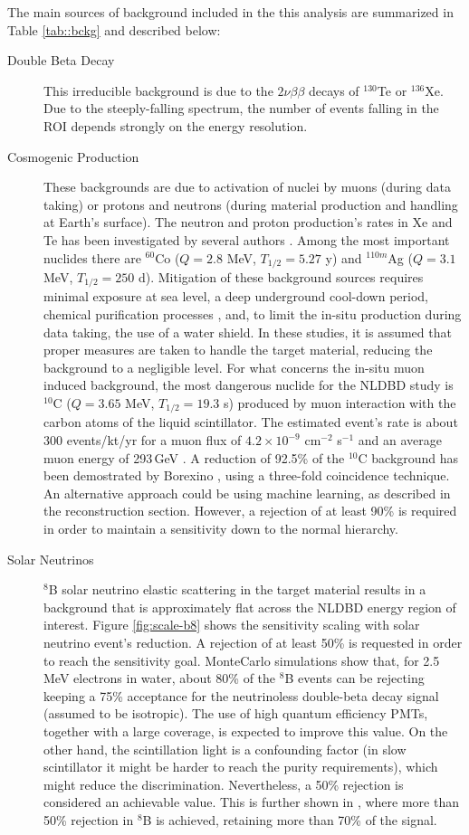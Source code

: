The main sources of background included in the this analysis are summarized in Table \ref{tab::bckg} and described below:

\begin{description}
\item[Double Beta Decay] This irreducible background is due to the $2\nu\beta\beta$ decays of $^{130}$Te or $^{136}$Xe. Due to the steeply-falling
spectrum, the number of events falling in the ROI depends strongly on the energy resolution.
\item[Cosmogenic Production] These backgrounds are due to activation of nuclei by muons (during data taking) or protons and neutrons (during material production and handling at Earth's surface). The neutron and proton production's rates in Xe and Te has been investigated by several authors \cite{mei09, baudis15, zhang16, norm05, bard97, wang15, lozza15}. Among the most important nuclides there are $^{60}$Co ($Q=2.8$ MeV, $T_{1/2}=5.27$ y) and $^{110m}$Ag ($Q=3.1$ MeV, $T_{1/2}=250$ d). Mitigation of these background sources requires minimal exposure at sea level, a deep underground cool-down period, chemical purification processes \cite{snop16}, and, to limit the in-situ production during data taking, the use of a water shield. In these studies, it is assumed that proper measures are taken to handle the target material, reducing the background to a negligible level. For what concerns the in-situ muon induced background, the most dangerous nuclide for the NLDBD study is $^{10}$C ($Q=3.65$ MeV, $T_{1/2}=19.3$ s) produced by muon interaction with the carbon atoms of the liquid scintillator. The estimated event's rate is about 300 events/kt/yr \cite{hagn00} for a muon flux of $4.2\times10^{-9}$ cm$^{-2}$ s$^{-1}$ and an average muon energy of 293\,GeV \cite{mei06}. A reduction of 92.5\% of the $^{10}$C background has been demostrated by Borexino \cite{bxo2013}, using a three-fold coincidence technique\cite{galb05, gando16}. An alternative approach could be using machine learning, as described in the reconstruction section. However, a rejection of at least 90\% is required in order to maintain a sensitivity down to the normal hierarchy.
\item[Solar Neutrinos] $^{8}$B solar neutrino elastic scattering in the target material results in a background that is approximately flat across the NLDBD energy region of interest. Figure \ref{fig:scale-b8} shows the sensitivity scaling with solar neutrino event's reduction. A rejection of at least 50\% is requested in order to reach the sensitivity goal. MonteCarlo simulations show that, for 2.5\,MeV electrons in water, about 80\% of the $^{8}$B events can be rejecting keeping a 75\% acceptance for the neutrinoless double-beta decay signal (assumed to be isotropic). The use of high quantum efficiency PMTs, together with a large coverage, is expected to improve this value. On the other hand, the scintillation light is a confounding factor (in slow scintillator it might be harder to reach the purity requirements), which might reduce the discrimination. Nevertheless, a 50\% rejection is considered an achievable value. This is further shown in \cite{elagin19}, where more than 50\% rejection in $^{8}$B is achieved, retaining more than 70\% of the signal.

\end{description}
